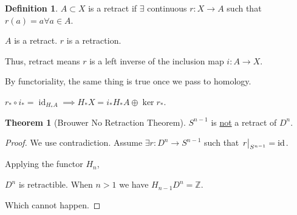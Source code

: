 \documentclass{article}
\theoremstyle{definition}
\newtheorem*{definition}{Definition}
\newtheorem{theorem}{Theorem}
\begin{document}
    \begin{definition}

        \(A \subset X\) is a retract if \(\exists\) continuous \(r: X \to A\) such that \(r(a) = a \forall a\in A\).

        \(A\) is a retract. \(r\) is a retraction.

        Thus, retract means \(r\) is a left inverse of the inclusion map \(i: A \to X\).

        By functoriality, the same thing is true once we pass to homology.

        \(r_{\ast} \circ i_{\ast} = \operatorname{id}_{H_{\ast} A} \implies  H_{\ast} X = i_{\ast} H_{\ast} A \oplus \ker r_{\ast}\).
    \end{definition}

    \begin{theorem}
        [Brouwer No Retraction Theorem] \(S^{n-1}\) is \underline{not} a retract of \(D^n\).
    \end{theorem}

    \begin{proof}
        We use contradiction. Assume \(\exists r: D^n \to S^{n-1}\) such that \(\eval{r}_{S^{n-1}}^{} = \operatorname{id}_{}\).

        \begin{center}
        \end{center}

        Applying the functor \(H_n\), 

        \begin{center}
        \end{center}

        \(D^n\) is retractible. When \(n > 1\) we have \(H_{n-1} D^n = \mathbb{Z}\).

        \begin{center}
        \end{center}

        Which cannot happen.

    \end{proof}
\end{document}
